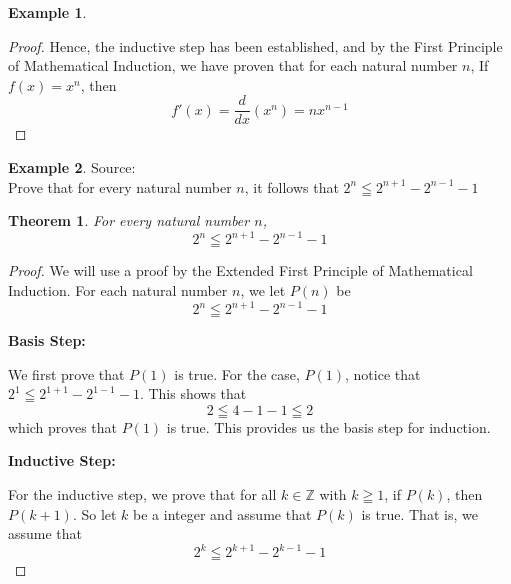\documentclass{book}
\newtheorem{theorem}{Theorem}[section]
\theoremstyle{definition}
\newtheorem{example}{Example}[definition]
\theoremstyle{remark}
\newcommand{\bb}[1]{\mathbb{#1}}
\begin{document}
\begin{example}
\begin{proof}
        
        Hence, the inductive step has been established, and by the First Principle of Mathematical Induction, we have proven that for each natural number $n$, If $f(x) = x^n$, then
            \begin{equation*}
                f'(x) = \frac{d}{dx}(x^n) = nx^{n-1}
            \end{equation*} 
    \end{proof}
\end{example}





\newpage
\begin{example}
Source: \cite[C.10]{Hammack} \\ 

Prove that for every natural number $n$, it follows that  $2^n \leqq 2^{n+1} - 2^{n-1} - 1$ 
\begin{tcolorbox}
    \begin{theorem}
        For every natural number $n$,
        \begin{equation*}
            2^n \leqq 2^{n+1} - 2^{n-1} - 1              
        \end{equation*}
    \end{theorem}
\end{tcolorbox}

\begin{proof}
    We will use a proof by the Extended First Principle of Mathematical Induction. For each natural number $n$, we let $P(n)$ be
        \begin{equation*}
            2^n \leqq 2^{n+1} - 2^{n-1} - 1 
        \end{equation*}
    \begin{flushleft} \textbf{Basis Step:} \end{flushleft}
        We first prove that $P(1)$ is true. For the case, $P(1)$, notice that $2^1 \leqq 2^{1+1} - 2^{1-1} - 1$. This shows that   
            \begin{equation*}
                2 \leqq 4-1-1 \leqq 2
            \end{equation*}
        which proves that $P(1)$ is true. This provides us the basis step for induction. \\ 
    
    \begin{flushleft} \textbf{Inductive Step:} \end{flushleft}
        For the inductive step, we prove that for all $k \in \bb{Z}$ with $k \geqq 1$, if $P(k)$, then $P(k+1)$. So let $k$ be a integer and assume that $P(k)$ is true. That is, we assume that 
            \begin{equation*}
                2^k \leqq 2^{k+1} - 2^{k-1} - 1 
            \end{equation*}
        

\end{proof}
\end{example}
\end{document}

